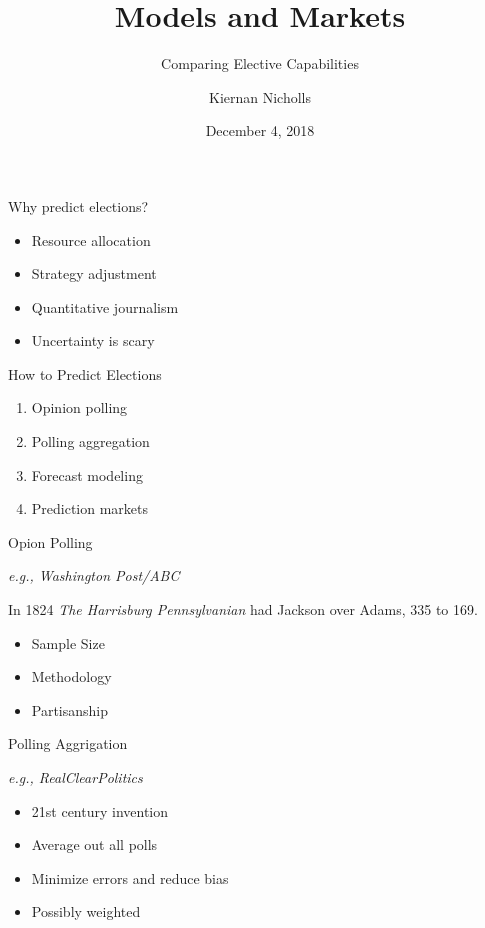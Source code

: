 \documentclass[ignorenonframetext,]{beamer}
\title{Models and Markets}
\subtitle{Comparing Elective Capabilities}
\author{Kiernan Nicholls}
\date{December 4, 2018}
\providecommand{\tightlist}{%
  \setlength{\itemsep}{0pt}\setlength{\parskip}{0pt}}
\begin{document}
\frame{\titlepage}

\begin{frame}{Why predict elections?}

\begin{itemize}
\tightlist
\item
  Resource allocation
\item
  Strategy adjustment
\item
  Quantitative journalism
\item
  Uncertainty is scary
\end{itemize}

\end{frame}

\begin{frame}{How to Predict Elections}

\begin{enumerate}
\def\labelenumi{\arabic{enumi}.}
\tightlist
\item
  Opinion polling
\item
  Polling aggregation
\item
  Forecast modeling
\item
  Prediction markets
\end{enumerate}

\end{frame}

\begin{frame}{Opion Polling}

\emph{e.g., Washington Post/ABC}

In 1824 \emph{The Harrisburg Pennsylvanian} had Jackson over Adams, 335
to 169.

\begin{itemize}
\tightlist
\item
  Sample Size
\item
  Methodology
\item
  Partisanship
\end{itemize}

\end{frame}

\begin{frame}{Polling Aggrigation}

\emph{e.g., RealClearPolitics}

\begin{itemize}
\tightlist
\item
  21st century invention
\item
  Average out all polls
\item
  Minimize errors and reduce bias
\item
  Possibly weighted
\end{itemize}

\end{frame}
\end{document}

